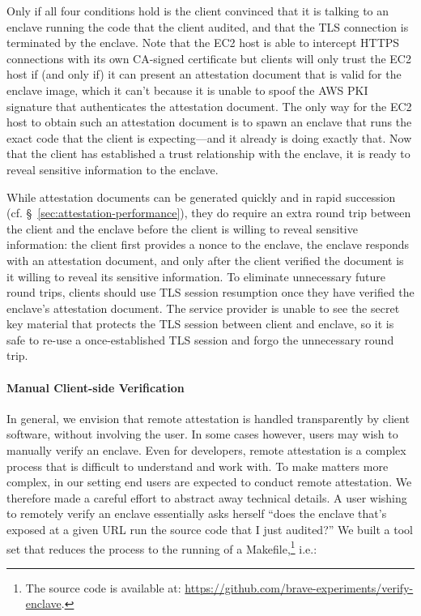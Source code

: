 Only if all four conditions hold is the client convinced that it is talking to
an enclave running the code that the client audited, and that the TLS connection
is terminated by the enclave.  Note that the EC2 host is able to intercept HTTPS
connections with its own CA-signed certificate but clients will only trust the
EC2 host if (and only if) it can present an attestation document that is valid
for the enclave image, which it can't because it is unable to spoof the AWS PKI
signature that authenticates the attestation document.  The only way for the EC2
host to obtain such an attestation document is to spawn an enclave that runs the
exact code that the client is expecting---and it already is doing exactly that.
Now that the client has established a trust relationship with the enclave, it is
ready to reveal sensitive information to the enclave.

While attestation documents can be generated quickly and in rapid succession
(cf. \S~\ref{sec:attestation-performance}), they do require an extra round trip
between the client and the enclave before the client is willing to reveal
sensitive information: the client first provides a nonce to the enclave, the
enclave responds with an attestation document, and only after the client
verified the document is it willing to reveal its sensitive information.  To
eliminate unnecessary future round trips, clients should use TLS session
resumption once they have verified the enclave's attestation document.  The
service provider is unable to see the secret key material that protects the TLS
session between client and enclave, so it is safe to re-use a once-established
TLS session and forgo the unnecessary round trip.

\paragraph{Manual Client-side Verification}

In general, we envision that remote attestation is handled transparently by
client software, without involving the user.  In some cases however, users may
wish to manually verify an enclave.  Even for developers, remote attestation is
a complex process that is difficult to understand and work with.  To make
matters more complex, in our setting end users are expected to conduct remote
attestation.  We therefore made a careful effort to abstract away technical
details.  A user wishing to remotely verify an enclave essentially asks herself
``does the enclave that's exposed at a given URL run the source code that I just
audited?''  We built a tool set that reduces the process to the running of a
Makefile,\footnote{The source code is available at:
\url{https://github.com/brave-experiments/verify-enclave}.} i.e.:

